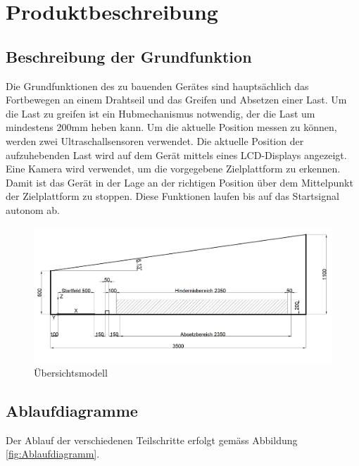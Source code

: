\documentclass[a4paper]{report}
\begin{document}
\chapter{Produktbeschreibung}
\label{ch:Produktbeschreibung}

\section{Beschreibung der Grundfunktion}
\label{sec:GrundBeschrieb}
Die Grundfunktionen des zu bauenden Gerätes sind hauptsächlich das Fortbewegen an einem Drahtseil und das Greifen und Absetzen einer Last. Um die Last zu greifen ist ein Hubmechanismus notwendig, der die Last um mindestens 200mm heben kann. Um die aktuelle Position messen zu können, werden zwei Ultraschallsensoren verwendet. Die aktuelle Position der aufzuhebenden Last wird auf dem Gerät mittels eines LCD-Displays angezeigt. Eine Kamera wird verwendet, um die vorgegebene Zielplattform zu erkennen. Damit ist das Gerät in der Lage an der richtigen Position über dem Mittelpunkt der Zielplattform zu stoppen. Diese Funktionen laufen bis auf das Startsignal autonom ab.

\begin{figure}[h!]
	\includegraphics[keepaspectratio,width=\textwidth]{PrenFunktionsskizze}
	\caption{Übersichtsmodell}
	\label{fig:Funktionsskizze}
\end{figure}

\newpage
\section{Ablaufdiagramme}
\label{sec:Ablaufdiagramme}
Der Ablauf der verschiedenen Teilschritte erfolgt gemäss Abbildung \ref{fig:Ablaufdiagramm}.
\end{document}
